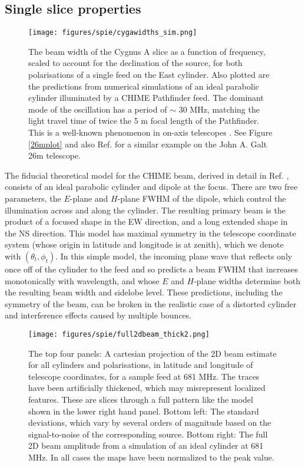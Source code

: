 \subsection{Single slice properties}

\begin{figure}[ht] %
	\centering
	\texttt{[image: figures/spie/cygawidths\_sim.png]}%
	\caption{The beam width of the Cygnus A slice as a function of frequency, scaled to account for the declination of the source, for both polarisations of a single feed on the East cylinder. Also plotted are the predictions from numerical simulations of an ideal parabolic cylinder illuminated by a CHIME Pathfinder feed. The dominant mode of the oscillation has a period of $\sim$ 30 MHz, matching the light travel time of twice the 5 m focal length of the Pathfinder. This is a well-known phenomenon in on-axis telescopes \citep{wander1, wander2}. See Figure \ref{26mplot} and also Ref. \citep{wolleben1} for a similar example on the John A. Galt 26m telescope.}
	\label{beamwidths}
\end{figure}

The fiducial theoretical model for the CHIME beam, derived in detail in Ref. \citep{mmodes2}, consists of an ideal parabolic cylinder and dipole at the focus. There are two free parameters, the $E$-plane and $H$-plane FWHM of the dipole, which control the illumination across and along the cylinder. The resulting primary beam is the product of a focused shape in the EW direction, and a long extended shape in the NS direction. This model has maximal symmetry in the telescope coordinate system (whose origin in latitude and longitude is at zenith), which we denote with $(\theta_t, \phi_t)$. In this simple model, the incoming plane wave that reflects only once off of the cylinder to the feed and so predicts a beam FWHM that increases monotonically with wavelength, and whose $E$ and $H$-plane widths determine both the resulting beam width and sidelobe level. These predictions, including the symmetry of the beam, can be broken in the realistic case of a distorted cylinder and interference effects caused by multiple bounces. 

\begin{figure}[htp] %
	\centering
	\texttt{[image: figures/spie/full2dbeam\_thick2.png]}%
	\caption{The top four panels: A cartesian projection of the 2D beam estimate for all cylinders and polarisations, in latitude and longitude of telescope coordinates, for a sample feed at 681 MHz. The traces have been artificially thickened, which may misrepresent localized features. These are slices through a full pattern like the model shown in the lower right hand panel. Bottom left: The standard deviations, which vary by several orders of magnitude based on the signal-to-noise of the corresponding source. Bottom right: The full 2D beam amplitude from a simulation of an ideal cylinder at 681 MHz. In all cases the maps have been normalized to the peak value.}
	\label{full2dbeam}
\end{figure}

